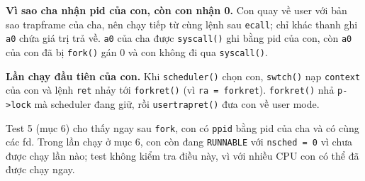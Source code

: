 \textbf{Vì sao cha nhận pid của con, còn con nhận 0.} Con quay về user với bản sao trapframe của cha, nên chạy tiếp từ cùng lệnh sau \texttt{ecall}; chỉ khác thanh ghi \texttt{a0} chứa giá trị trả về. \texttt{a0} của cha được \texttt{syscall()} ghi bằng pid của con, còn \texttt{a0} của con đã bị \texttt{fork()} gán 0 và con không đi qua \texttt{syscall()}.

\textbf{Lần chạy đầu tiên của con.} Khi \texttt{scheduler()} chọn con, \texttt{swtch()} nạp \texttt{context} của con và lệnh \texttt{ret} nhảy tới \texttt{forkret()} (vì \texttt{ra = forkret}). \texttt{forkret()} nhả \texttt{p->lock} mà scheduler đang giữ, rồi \texttt{usertrapret()} đưa con về user mode.

Test 5 (mục 6) cho thấy ngay sau \texttt{fork}, con có \texttt{ppid} bằng pid của cha và có cùng các fd. Trong lần chạy ở mục 6, con còn đang \texttt{RUNNABLE} với \texttt{nsched = 0} vì chưa được chạy lần nào; test không kiểm tra điều này, vì với nhiều CPU con có thể đã được chạy ngay.
